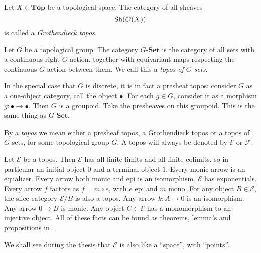 \begin{definition}
\label{def:sheaf topos}
Let $X \in \mathbf{Top}$ be a topological space. The category of all sheaves
\[ \operatorname{Sh}(\mathcal{O}(X)) \]
is called a \emph{Grothendieck topos}.
\end{definition}
\begin{definition}
\label{def:Gset topos}
Let $G$ be a topological group. The category $G\text{-}\mathbf{Set}$ is the category of all sets with a continuous right $G$-action, together with equivariant maps respecting the continuous $G$ action between them. We call this a \emph{topos of $G$-sets}.
\end{definition}
In the special case that $G$ is discrete, it is in fact a presheaf topos: consider $G$ as a one-object category, call the object $\bullet$. For each $g \in G$, consider it as a morphism $g : \bullet \to \bullet$. Then $G$ is a groupoid. Take the presheaves on this groupoid. This is the same thing as $G\text{-}\mathbf{Set}$.
\begin{definition}
\label{def:topos}
By a \emph{topos} we mean either a presheaf topos, a Grothendieck topos or a topos of $G$-sets, for some topological group $G$. A topos will always be denoted by $\mathscr{E}$ or $\mathscr{F}$.
\end{definition}

\begin{fact} Let $\mathscr{E}$ be a topos. Then $\mathscr{E}$ has all finite limits and all finite colimits, so in particular an initial object $0$ and a terminal object $1$. Every monic arrow is an equalizer. Every arrow both monic and epi is an isomorphism. $\mathscr{E}$ has exponentials. Every arrow $f$ factors as $f = m \circ e$, with $e$ epi and $m$ mono. For any object $B \in \mathscr{E}$, the slice category $\mathscr{E}/B$ is also a topos. Any arrow $k : A \to 0$ is an isomorphism. Any arrow $0 \to B$ is monic.
Any object $C \in \mathscr{E}$ has a monomorphism to an injective object. All of these facts can be found as theorems, lemma's and propositions in \cite[Chapter 3]{MacLaneMoerdijk91}.
\end{fact}

We shall see during the thesis that $\mathscr{E}$ is also like a ``space'', with ``points''.

